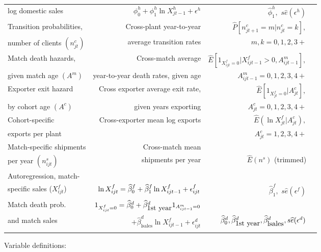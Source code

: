 \begin{table}[tbp]
\begin{tabular}{lrrr}
log domestic sales & $\phi _{0}^{h}+\phi _{1}^{h}\ln X_{jt-1}^{h}+\epsilon ^{h}$
 & $\widehat{\phi }_{1}^{h},$ $s\widehat{e}(\epsilon ^{h})$ \\ \noalign{\smallskip} \hline \noalign{\smallskip}
Transition probabilities, & Cross-plant year-to-year & $\widehat{P}%
[n_{jt+1}^{c}=m|n_{jt}^{c}=k],$ \\ 
number of clients $(n_{jt}^{c})$ & average transition rates & $m,k=0,1,2,3+$
\\ \noalign{\smallskip} \hline \noalign{\smallskip}
Match death hazards, & Cross-match average & $\widehat{E}%
[1_{X_{ijt}^{f}=0}|X_{ijt-1}^{f}>0,A_{ijt-1}^{m}],$ \\ 
given match age $(A^{m})$ & year-to-year death rates, given age & $%
A_{ijt-1}^{m}=0,1,2,3,4+$ \\ \noalign{\smallskip} \hline \noalign{\smallskip}
Exporter exit hazard & Cross exporter average exit rate, & $\widehat{E}%
[1_{X_{jt}^{f}=0}|A_{jt}^{c}],$ \\ 
by cohort age $(A^{c})$ & given years exporting & $A_{jt}^{c}=0,1,2,3,4+$ \\ \noalign{\smallskip} \hline \noalign{\smallskip}
Cohort-specific & Cross-exporter mean log exports & $\widehat{E}(\ln
X_{jt}^{f}|A_{jt}^{c}),$ \\ 
exports per plant &  & $A_{jt}^{c}=1,2,3,4+$ \\ \noalign{\smallskip} \hline \noalign{\smallskip}
Match-specific shipments & Cross-match mean &  \\ 
per year $(n_{ijt}^{s})$ & shipments per year & $\widehat{E}\left(n^{s}\right) $ (trimmed) \\ \noalign{\smallskip} \hline \noalign{\smallskip}
Autoregression, match- &  & \\
specific sales ($X_{ijt}^{f}$) & $\ln X_{ijt}^{f}=\widehat{\beta }_{0}^{f}+\widehat{%
\beta }_{1}^{f}\ln X_{ijt-1}^{f}+\epsilon _{ijt}^{f}$ & $\widehat{\beta }_{1}^{f},$ $s\widehat{e}(\epsilon ^{f})$ \\ \noalign{\smallskip} \hline \noalign{\smallskip}
Match death prob. & $1_{X_{ijt}^{f}=0}=\widehat{\beta }_{0}^{d}+\widehat{%
\beta }_{\mbox{1st year}}^{d}1_{A_{ijt-1}^{m}=0}$ &  \\ \noalign{\smallskip}
and match sales & $+\widehat{\beta }_{\mbox{lsales}}^{d}\ln
X_{ijt-1}^{f}+\epsilon _{ijt}^{d}$ & $\widehat{\beta }_{0}^{d},\widehat{\beta }_{\mbox{1st year}}^{d},\widehat{\beta }_{%
\mbox{lsales}}^{d},s\widehat{e}(\epsilon ^{d})$ \\ \noalign{\smallskip} \hline \noalign{\smallskip}
\end{tabular}%
\newline\flushleft\small{\small Variable definitions: }


\end{table}
